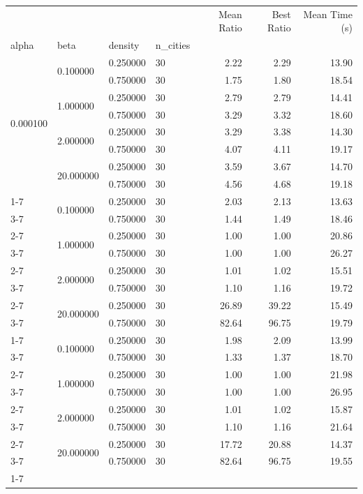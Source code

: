 \begin{tabular}{llllrrr}
\toprule
 &  &  &  & Mean Ratio & Best Ratio & Mean Time (s) \\
alpha & beta & density & n_cities &  &  &  \\
\midrule
\multirow[t]{8}{*}{0.000100} & \multirow[t]{2}{*}{0.100000} & 0.250000 & 30 & 2.22 & 2.29 & 13.90 \\
\cline{3-7}
 &  & 0.750000 & 30 & 1.75 & 1.80 & 18.54 \\
\cline{2-7} \cline{3-7}
 & \multirow[t]{2}{*}{1.000000} & 0.250000 & 30 & 2.79 & 2.79 & 14.41 \\
\cline{3-7}
 &  & 0.750000 & 30 & 3.29 & 3.32 & 18.60 \\
\cline{2-7} \cline{3-7}
 & \multirow[t]{2}{*}{2.000000} & 0.250000 & 30 & 3.29 & 3.38 & 14.30 \\
\cline{3-7}
 &  & 0.750000 & 30 & 4.07 & 4.11 & 19.17 \\
\cline{2-7} \cline{3-7}
 & \multirow[t]{2}{*}{20.000000} & 0.250000 & 30 & 3.59 & 3.67 & 14.70 \\
\cline{3-7}
 &  & 0.750000 & 30 & 4.56 & 4.68 & 19.18 \\
\cline{1-7} \cline{2-7} \cline{3-7}
\multirow[t]{8}{*}{1.000000} & \multirow[t]{2}{*}{0.100000} & 0.250000 & 30 & 2.03 & 2.13 & 13.63 \\
\cline{3-7}
 &  & 0.750000 & 30 & 1.44 & 1.49 & 18.46 \\
\cline{2-7} \cline{3-7}
 & \multirow[t]{2}{*}{1.000000} & 0.250000 & 30 & 1.00 & 1.00 & 20.86 \\
\cline{3-7}
 &  & 0.750000 & 30 & 1.00 & 1.00 & 26.27 \\
\cline{2-7} \cline{3-7}
 & \multirow[t]{2}{*}{2.000000} & 0.250000 & 30 & 1.01 & 1.02 & 15.51 \\
\cline{3-7}
 &  & 0.750000 & 30 & 1.10 & 1.16 & 19.72 \\
\cline{2-7} \cline{3-7}
 & \multirow[t]{2}{*}{20.000000} & 0.250000 & 30 & 26.89 & 39.22 & 15.49 \\
\cline{3-7}
 &  & 0.750000 & 30 & 82.64 & 96.75 & 19.79 \\
\cline{1-7} \cline{2-7} \cline{3-7}
\multirow[t]{8}{*}{1000.000000} & \multirow[t]{2}{*}{0.100000} & 0.250000 & 30 & 1.98 & 2.09 & 13.99 \\
\cline{3-7}
 &  & 0.750000 & 30 & 1.33 & 1.37 & 18.70 \\
\cline{2-7} \cline{3-7}
 & \multirow[t]{2}{*}{1.000000} & 0.250000 & 30 & 1.00 & 1.00 & 21.98 \\
\cline{3-7}
 &  & 0.750000 & 30 & 1.00 & 1.00 & 26.95 \\
\cline{2-7} \cline{3-7}
 & \multirow[t]{2}{*}{2.000000} & 0.250000 & 30 & 1.01 & 1.02 & 15.87 \\
\cline{3-7}
 &  & 0.750000 & 30 & 1.10 & 1.16 & 21.64 \\
\cline{2-7} \cline{3-7}
 & \multirow[t]{2}{*}{20.000000} & 0.250000 & 30 & 17.72 & 20.88 & 14.37 \\
\cline{3-7}
 &  & 0.750000 & 30 & 82.64 & 96.75 & 19.55 \\
\cline{1-7} \cline{2-7} \cline{3-7}
\bottomrule
\end{tabular}
